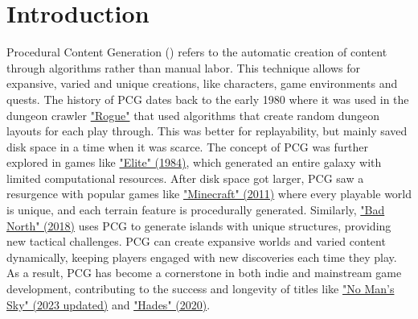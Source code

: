 
\chapter{Introduction}
\label{cha:Introduction}

Procedural Content Generation () refers to the automatic creation of content through algorithms rather than manual labor. This technique allows for expansive, varied and unique creations, like characters, game environments and quests. 
The history of PCG dates back to the early 1980 where it was used in the dungeon crawler \href{https://en.wikipedia.org/wiki/Rogue_(video_game)}{"Rogue"} that used algorithms that create random dungeon layouts for each play through. This was better for replayability, but mainly saved disk space in a time when it was scarce. The concept of PCG was further explored in games like \href{https://en.wikipedia.org/wiki/Elite_(video_game)}{"Elite" (1984)}, which generated an entire galaxy with limited computational resources.
After disk space got larger, PCG saw a resurgence with popular games like \href{https://en.wikipedia.org/wiki/Minecraft_(video_game)}{"Minecraft" (2011)} where every playable world is unique, and each terrain feature is procedurally generated. Similarly, \href{https://en.wikipedia.org/wiki/Bad_North}{"Bad North" (2018)} uses PCG to generate islands with unique structures, providing new tactical challenges. PCG can create expansive worlds and varied content dynamically, keeping players engaged with new discoveries each time they play. As a result, PCG has become a cornerstone in both indie and mainstream game development, contributing to the success and longevity of titles like \href{https://en.wikipedia.org/wiki/No_Mans_Sky}{"No Man's Sky" (2023 updated)} and \href{https://en.wikipedia.org/wiki/Hades_(video_game)}{"Hades" (2020)}.

